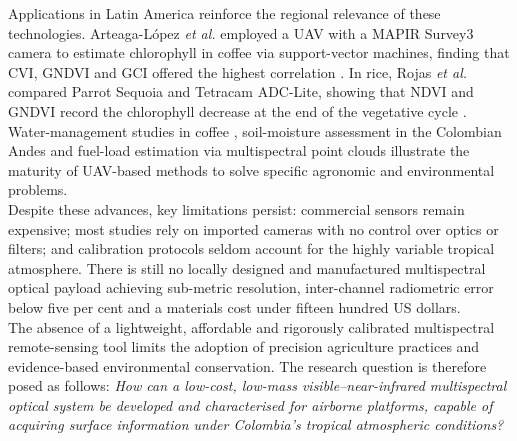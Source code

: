 \noindent Applications in Latin America reinforce the regional relevance of
these technologies.  Arteaga-López \emph{et al.} employed a UAV with a
MAPIR Survey3 camera to estimate chlorophyll in coffee via support-vector
machines, finding that CVI, GNDVI and GCI offered the highest
correlation \cite{Arteaga2022}.  In rice, Rojas \emph{et al.} compared
Parrot Sequoia and Tetracam ADC-Lite, showing that NDVI and GNDVI record
the chlorophyll decrease at the end of the vegetative cycle
\cite{Rojas2018Drones}.  Water-management studies in coffee
\cite{Orlando2023POTENTIALIRRIGATION}, soil-moisture assessment in the
Colombian Andes \cite{Casamitjana2020SoilMoisture} and fuel-load
estimation via multispectral point clouds
\cite{Villacres2022ConstructionAreas} illustrate the maturity of
UAV-based methods to solve specific agronomic and environmental
problems.\\

\noindent Despite these advances, key limitations persist: commercial
sensors remain expensive; most studies rely on imported cameras with no
control over optics or filters; and calibration protocols seldom account
for the highly variable tropical atmosphere.  There is still no locally
designed and manufactured multispectral optical payload achieving sub-metric
resolution, inter-channel radiometric error below five per cent and a
materials cost under fifteen hundred US dollars.\\

\noindent The absence of a lightweight, affordable and rigorously calibrated
multispectral remote-sensing tool limits the adoption of precision
agriculture practices and evidence-based environmental conservation.
The research question is therefore posed as follows: \emph{How can a
low-cost, low-mass visible–near-infrared multispectral optical system be
developed and characterised for airborne platforms, capable of acquiring
surface information under Colombia’s tropical atmospheric
conditions?}\\


